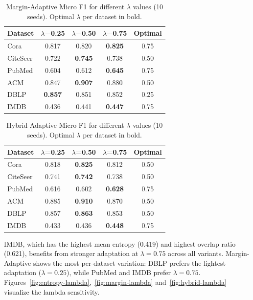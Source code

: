 \documentclass[pdflatex,sn-mathphys-num]{sn-jnl}%
\theoremstyle{thmstyleone}%
\theoremstyle{thmstyletwo}%
\theoremstyle{thmstylethree}%
\begin{document}
\begin{table}[ht]
\centering
\caption{Margin-Adaptive Micro F1 for different $\lambda$ values (10 seeds). Optimal $\lambda$ per dataset in bold.}
\label{tab:margin-lambda}
\begin{tabular}{lcccc}
\toprule
\textbf{Dataset} & $\lambda$=0.25 & $\lambda$=0.50 & $\lambda$=0.75 & \textbf{Optimal} \\
\midrule
Cora      & 0.817 & 0.820 & \textbf{0.825} & 0.75 \\
CiteSeer  & 0.722 & \textbf{0.745} & 0.738 & 0.50 \\
PubMed    & 0.604 & 0.612 & \textbf{0.645} & 0.75 \\
ACM       & 0.847 & \textbf{0.907} & 0.880 & 0.50 \\
DBLP      & \textbf{0.857} & 0.851 & 0.852 & 0.25 \\
IMDB      & 0.436 & 0.441 & \textbf{0.447} & 0.75 \\
\bottomrule
\end{tabular}
\end{table}

\begin{table}[ht]
\centering
\caption{Hybrid-Adaptive Micro F1 for different $\lambda$ values (10 seeds). Optimal $\lambda$ per dataset in bold.}
\label{tab:hybrid-lambda}
\begin{tabular}{lcccc}
\toprule
\textbf{Dataset} & $\lambda$=0.25 & $\lambda$=0.50 & $\lambda$=0.75 & \textbf{Optimal} \\
\midrule
Cora      & 0.818 & \textbf{0.825} & 0.812 & 0.50 \\
CiteSeer  & 0.741 & \textbf{0.742} & 0.738 & 0.50 \\
PubMed    & 0.616 & 0.602 & \textbf{0.628} & 0.75 \\
ACM       & 0.885 & \textbf{0.910} & 0.870 & 0.50 \\
DBLP      & 0.857 & \textbf{0.863} & 0.853 & 0.50 \\
IMDB      & 0.433 & 0.436 & \textbf{0.448} & 0.75 \\
\bottomrule
\end{tabular}
\end{table}

IMDB, which has the highest mean entropy (0.419) and highest overlap ratio (0.621), benefits from stronger adaptation at $\lambda = 0.75$ across all variants.
Margin-Adaptive shows the most per-dataset variation: DBLP prefers the lightest adaptation ($\lambda = 0.25$), while PubMed and IMDB prefer $\lambda = 0.75$.
Figures~\ref{fig:entropy-lambda},~\ref{fig:margin-lambda} and~\ref{fig:hybrid-lambda} visualize the lambda sensitivity.
\end{document}
